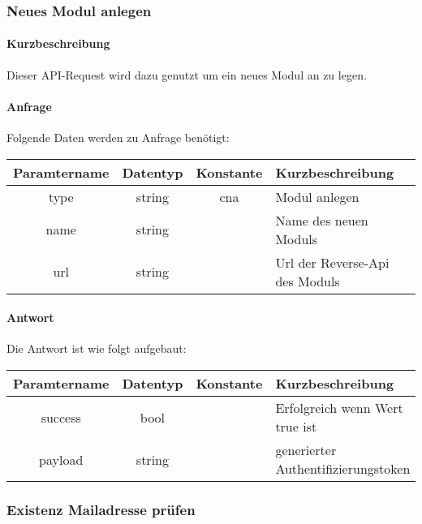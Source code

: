 \subsubsection{Neues Modul anlegen}
\paragraph{Kurzbeschreibung}Dieser API-Request wird dazu genutzt um ein neues Modul an zu legen.
\paragraph{Anfrage}Folgende Daten werden zu Anfrage benötigt:
\begin{table}[H]
	\begin{tabular}{|c|c|c|p{6.5cm}|}
		\hline
		\textbf{Paramtername} & \textbf{Datentyp} & \textbf{Konstante} & \textbf{Kurzbeschreibung}                                                                                               \\ \hline
		type                & string            & cna                & Modul anlegen \\ \hline
		name                & string            &                    & Name des neuen Moduls \\ \hline
		url					& string			&					 & Url der Reverse-Api des Moduls \\ \hline
	\end{tabular}
\end{table}
\paragraph{Antwort}Die Antwort ist wie folgt aufgebaut:
\begin{table}[H]
	\begin{tabular}{|c|c|c|p{6.5cm}|}
		\hline
		\textbf{Paramtername} & \textbf{Datentyp} & \textbf{Konstante} & \textbf{Kurzbeschreibung}            \\ \hline                
		success             & bool             &                 & Erfolgreich wenn Wert {\glqq true\grqq} ist \\ \hline
		payload             & string           &                 & generierter Authentifizierungstoken \\ \hline
	\end{tabular}
\end{table}
\subsubsection{Existenz Mailadresse prüfen}
